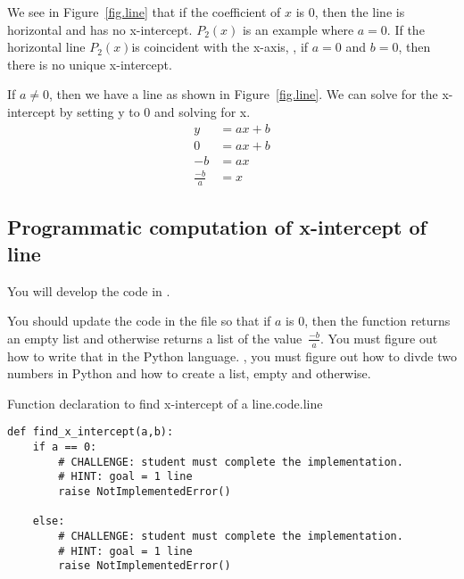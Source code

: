We see in Figure~\ref{fig.line} that if the coefficient of $x$ is 0, then the
line is horizontal and has no x-intercept. $P_2(x)$ is an example where $a=0$.
If the horizontal line $P_2(x)$is coincident
with the x-axis, \ie, if $a=0$ and $b=0$, then there is no unique x-intercept.





If $a\neq 0$,  then we have a line as shown in Figure~\ref{fig.line}.  We can
solve for the x-intercept by setting y to 0 and solving for x.
\begin{align*}
  y &= a x + b\\
  0 &= a x + b\\
  -b &= a x\\
  \frac{-b}{a} &= x
\end{align*}



\subsection{Programmatic computation of x-intercept of line}

You will develop the code in .

You should update the code in the file  so that if
$a$ is 0, then the function returns an empty list and otherwise
returns a list of the value~$\frac{-b}{a}$.  You must figure out how
to write that in the Python language.  \Ie, you must figure out how to
divde two numbers in Python and how to create a list, empty and
otherwise.


\begin{listing}{Function declaration to find x-intercept of a line.}{code.line}
\begin{minipage}[c]{0.95\textwidth}\begin{lstlisting}
def find_x_intercept(a,b):
    if a == 0:
        # CHALLENGE: student must complete the implementation.
        # HINT: goal = 1 line
        raise NotImplementedError()

    else:
        # CHALLENGE: student must complete the implementation.
        # HINT: goal = 1 line
        raise NotImplementedError()
\end{lstlisting}\end{minipage}\end{listing}


